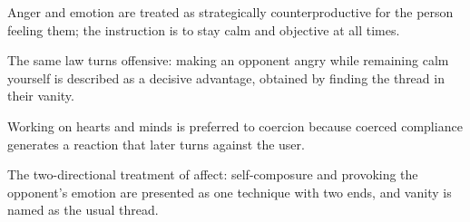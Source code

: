 

\begin{distilled}
  \item Anger and emotion are treated as strategically counterproductive for the person feeling them; the instruction is to stay calm and objective at all times.
  \item The same law turns offensive: making an opponent angry while remaining calm yourself is described as a decisive advantage, obtained by finding the thread in their vanity.
  \item Working on hearts and minds is preferred to coercion because coerced compliance generates a reaction that later turns against the user.
\end{distilled}

\begin{unique}
  \item The two-directional treatment of affect: self-composure and provoking the opponent's emotion are presented as one technique with two ends, and vanity is named as the usual thread.
\end{unique}
